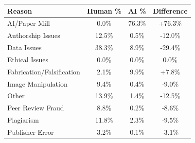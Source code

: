 \begin{tabular}{lccc}
\toprule
\textbf{Reason} & \textbf{Human \%} & \textbf{AI \%} & \textbf{Difference} \\
\midrule
AI/Paper Mill & 0.0\% & 76.3\% & +76.3\% \\
Authorship Issues & 12.5\% & 0.5\% & -12.0\% \\
Data Issues & 38.3\% & 8.9\% & -29.4\% \\
Ethical Issues & 0.0\% & 0.0\% & 0.0\% \\
Fabrication/Falsification & 2.1\% & 9.9\% & +7.8\% \\
Image Manipulation & 9.4\% & 0.4\% & -9.0\% \\
Other & 13.9\% & 1.4\% & -12.5\% \\
Peer Review Fraud & 8.8\% & 0.2\% & -8.6\% \\
Plagiarism & 11.8\% & 2.3\% & -9.5\% \\
Publisher Error & 3.2\% & 0.1\% & -3.1\% \\
\bottomrule
\end{tabular}